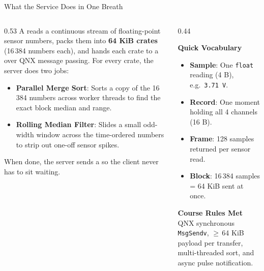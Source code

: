 \begin{frame}{What the Service Does in One Breath}
  \begin{columns}[t, onlytextwidth]
    \begin{column}{0.53\textwidth}
      \smalltext\compactitem
      A  reads a continuous stream of floating-point sensor numbers, packs them into \textbf{64 KiB crates} (16\,384 numbers each), and hands each crate to a  over QNX message passing.
      \vskip1mm
      For every crate, the server does two jobs:
      \begin{itemize}
        \item \textbf{Parallel Merge Sort}: Sorts a copy of the 16\,384 numbers across worker threads to find the exact block median and range.
        \item \textbf{Rolling Median Filter}: Slides a small odd-width window across the time-ordered numbers to strip out one-off sensor spikes.
      \end{itemize}
      \vskip1mm
      When done, the server sends a  so the client never has to sit waiting.
    \end{column}
    \begin{column}{0.44\textwidth}
      \smalltext\compactitem
      \begin{highlight}
        \textbf{Quick Vocabulary}
        \begin{itemize}
          \item \textbf{Sample}: One \texttt{float} reading (4 B), e.g.\ \texttt{3.71 V}.
          \item \textbf{Record}: One moment holding all 4 channels (16 B).
          \item \textbf{Frame}: 128 samples returned per sensor read.
          \item \textbf{Block}: 16\,384 samples = 64 KiB sent at once.
        \end{itemize}
      \end{highlight}
      \vskip0.5mm
      \begin{tech}
        \textbf{Course Rules Met} \\
        QNX synchronous \texttt{MsgSendv}, $\ge$\,64 KiB payload per transfer, multi-threaded sort, and async pulse notification.
      \end{tech}
    \end{column}
  \end{columns}
\end{frame}

